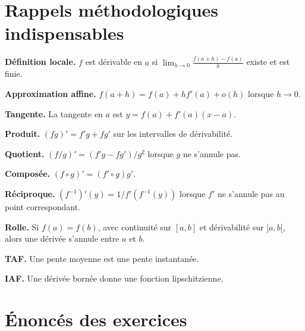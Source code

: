 \documentclass[11pt,a4paper]{article}
\begin{document}
\section{Rappels méthodologiques indispensables}
\begin{methodebox}
\textbf{Définition locale.} $f$ est dérivable en $a$ si $\lim_{h\to0}\frac{f(a+h)-f(a)}h$ existe et est finie.
\end{methodebox}

\begin{methodebox}
\textbf{Approximation affine.} $f(a+h)=f(a)+h f'(a)+o(h)$ lorsque $h\to0$.
\end{methodebox}

\begin{methodebox}
\textbf{Tangente.} La tangente en $a$ est $y=f(a)+f'(a)(x-a)$.
\end{methodebox}

\begin{methodebox}
\textbf{Produit.} $(fg)'=f'g+fg'$ sur les intervalles de dérivabilité.
\end{methodebox}

\begin{methodebox}
\textbf{Quotient.} $(f/g)'=(f'g-fg')/g^2$ lorsque $g$ ne s'annule pas.
\end{methodebox}

\begin{methodebox}
\textbf{Composée.} $(f\circ g)'=(f'\circ g)g'$.
\end{methodebox}

\begin{methodebox}
\textbf{Réciproque.} $(f^{-1})'(y)=1/f'(f^{-1}(y))$ lorsque $f'$ ne s'annule pas au point correspondant.
\end{methodebox}

\begin{methodebox}
\textbf{Rolle.} Si $f(a)=f(b)$, avec continuité sur $[a,b]$ et dérivabilité sur $]a,b[$, alors une dérivée s'annule entre $a$ et $b$.
\end{methodebox}

\begin{methodebox}
\textbf{TAF.} Une pente moyenne est une pente instantanée.
\end{methodebox}

\begin{methodebox}
\textbf{IAF.} Une dérivée bornée donne une fonction lipschitzienne.
\end{methodebox}

\newpage
\section{Énoncés des exercices}
\end{document}
